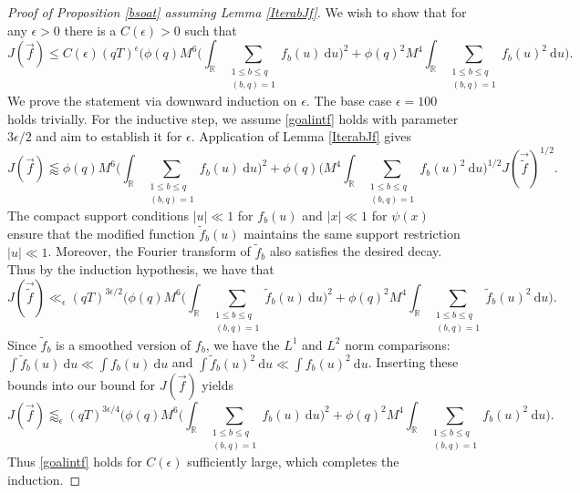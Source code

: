 \documentclass[12pt]{amsart}
\theoremstyle{definition}
\theoremstyle{plain}
\theoremstyle{remark}
\numberwithin{equation}{section}
\numberwithin{theorem}{section}
\numberwithin{equation}{section}
\begin{document}
	\begin{proof}[Proof of Proposition \ref{bsoat} assuming Lemma \ref{IterabJf}]
		We wish to show that for any $\epsilon > 0$ there is a $C(\epsilon)>0$ such that
		\begin{equation}\label{goalintf}
			J(\overrightarrow{f})\leq C(\epsilon)(qT)^{\epsilon}  \bigg(\phi(q) M^{6}\bigg(\int_{\mathbb{R}}\sum_{\substack{1 \leq b \leq q \\ (b, q)=1}}f_{b}(u)\:\mathrm{d}u\bigg)^{2}+
			\phi(q)^{2} M^{4}\int_{\mathbb{R}}\sum_{\substack{1 \leq b \leq q \\ (b, q)=1}}f_{b}(u)^{2}\:\mathrm{d}u\bigg).
		\end{equation}
		We prove the statement via downward induction on $\epsilon$. The base case $\epsilon=100$ holds trivially. For the inductive step, we assume \eqref{goalintf} holds with parameter $3\epsilon/2$ and aim to establish it for $\epsilon$. Application of Lemma \ref{IterabJf} gives 
		\[J(\overrightarrow{f})\lessapprox \phi(q) M^{6}\bigg(\int_{\mathbb{R}}\sum_{\substack{1 \leq b \leq q \\ (b, q)=1}}f_{b}(u)\:\mathrm{d}u\bigg)^{2}+
		\phi(q)\bigg(M^{4}\int_{\mathbb{R}}\sum_{\substack{1 \leq b \leq q \\ (b, q)=1}}f_{b}(u)^{2}\:\mathrm{d}u\bigg)^{1/2}J(\overrightarrow{\tilde{f}})^{1/2}.\]
		The compact support conditions $|u|\ll 1$ for $f_{b}(u)$ and $|x| \ll 1$ for $\psi(x)$ ensure that the modified function $\tilde{f}_{b}(u)$ maintains the same support restriction $|u|\ll 1$.  Moreover, the Fourier transform of $\tilde{f}_{b}$ also satisfies the desired decay. Thus by the induction hypothesis, we have that
		\[J(\overrightarrow{\tilde{f}})\ll_{\epsilon}(qT)^{3\epsilon/2} \bigg(\phi(q) M^{6}\bigg(\int_{\mathbb{R}}\sum_{\substack{1 \leq b \leq q \\ (b, q)=1}}\tilde{f}_{b}(u)\:\mathrm{d}u\bigg)^{2}+
		\phi(q)^{2} M^{4}\int_{\mathbb{R}}\sum_{\substack{1 \leq b \leq q \\ (b, q)=1}}\tilde{f}_{b}(u)^{2}\:\mathrm{d}u\bigg).\]
		Since $\tilde{f}_{b}$ is a smoothed version of $f_{b}$, we have the $L^{1}$ and $L^{2}$ norm comparisons: $\int \tilde{f}_{b}(u)\:\mathrm{d}u \ll \int f_{b}(u)\:\mathrm{d}u$ and $\int \tilde{f}_{b}(u)^{2}\:\mathrm{d}u \ll \int f_{b}(u)^{2}\:\mathrm{d}u$. Inserting these bounds into our bound for $J(\overrightarrow{f})$ yields
		\[J(\overrightarrow{f})\lessapprox_{\epsilon} (qT)^{3\epsilon/4}  \bigg(\phi(q) M^{6}\bigg(\int_{\mathbb{R}}\sum_{\substack{1 \leq b \leq q \\ (b, q)=1}}f_{b}(u)\:\mathrm{d}u\bigg)^{2}+
		\phi(q)^{2} M^{4}\int_{\mathbb{R}}\sum_{\substack{1 \leq b \leq q \\ (b, q)=1}}f_{b}(u)^{2}\:\mathrm{d}u\bigg).\]
		Thus \eqref{goalintf} holds for $C(\epsilon)$ sufficiently large, which completes the induction. 
	\end{proof}
	
\end{document}
